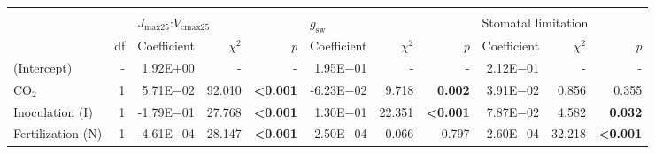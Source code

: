 \begin{landscape}
\begin{table}
{\begin{tabular}{p{3cm}p{0.5cm}p{1.75cm}p{1.5cm}p{1.5cm}p{1.75cm}p{1.5cm}p{1.5cm}p{1.75cm}p{1.5cm}p{1.5cm}}
            \hline

            &&&&&&&&&&
            \\

            && \multicolumn{3}{l}{$J_{\mathrm{max25}}$:$V_\mathrm{cmax25}$} 
            &  \multicolumn{3}{l}{$g_{\mathrm{sw}}$}
            &  \multicolumn{3}{l}{Stomatal limitation}
            \\
            \hline
            & \multicolumn{1}{r}{df}
            & \multicolumn{1}{r}{Coefficient}   & \multicolumn{1}{r}{$\chi^2$}    & \multicolumn{1}{r}{\textit{p}}
            & \multicolumn{1}{r}{Coefficient}   & \multicolumn{1}{r}{$\chi^2$}    & \multicolumn{1}{r}{\textit{p}} 
            & \multicolumn{1}{r}{Coefficient}   & \multicolumn{1}{r}{$\chi^2$}    & \multicolumn{1}{r}{\textit{p}}  
            \\
            \hline

            (Intercept) & \multicolumn{1}{r}{-}
            & \multicolumn{1}{r}{1.92E+00}      & \multicolumn{1}{r}{-}             & \multicolumn{1}{r}{-}
            & \multicolumn{1}{r}{1.95E$-$01}      & \multicolumn{1}{r}{-}             & \multicolumn{1}{r}{-}
            & \multicolumn{1}{r}{2.12E$-$01}      & \multicolumn{1}{r}{-}             & \multicolumn{1}{r}{-}
            \\

            CO$_2$ & \multicolumn{1}{r}{1}
            & \multicolumn{1}{r}{ 5.71E$-$02}     & \multicolumn{1}{r}{92.010}        & \multicolumn{1}{r}{\textbf{<0.001}}
            & \multicolumn{1}{r}{-6.23E$-$02}     & \multicolumn{1}{r}{9.718}         & \multicolumn{1}{r}{\textbf{ 0.002}}
            & \multicolumn{1}{r}{ 3.91E$-$02}     & \multicolumn{1}{r}{0.856}         & \multicolumn{1}{r}{0.355} 
            \\

            Inoculation (I) & \multicolumn{1}{r}{1}
            & \multicolumn{1}{r}{-1.79E$-$01}     & \multicolumn{1}{r}{27.768}        & \multicolumn{1}{r}{\textbf{<0.001}}
            & \multicolumn{1}{r}{ 1.30E$-$01}     & \multicolumn{1}{r}{22.351}        & \multicolumn{1}{r}{\textbf{<0.001}}
            & \multicolumn{1}{r}{ 7.87E$-$02}     & \multicolumn{1}{r}{4.582}         & \multicolumn{1}{r}{\textbf{ 0.032}} 
            \\

            Fertilization (N) & \multicolumn{1}{r}{1}
            & \multicolumn{1}{r}{-4.61E$-$04}     & \multicolumn{1}{r}{28.147}        & \multicolumn{1}{r}{\textbf{<0.001}}
            & \multicolumn{1}{r}{ 2.50E$-$04}     & \multicolumn{1}{r}{0.066}         & \multicolumn{1}{r}{0.797}
            & \multicolumn{1}{r}{ 2.60E$-$04}     & \multicolumn{1}{r}{32.218}        & \multicolumn{1}{r}{\textbf{<0.001}} 
            \\


\end{tabular}}
\end{table}
\end{landscape}
